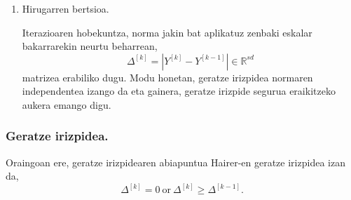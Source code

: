 \begin{enumerate}
\item Hirugarren bertsioa.

Iterazioaren hobekuntza, norma jakin bat aplikatuz zenbaki eskalar bakarrarekin neurtu beharrean,
\begin{equation}
\label{eq:DD3}
\Delta^{[k]}=|Y^{[k]}-Y^{[k-1]}| \in \mathbb{R}^{sd}
\end{equation}
matrizea erabiliko dugu. Modu honetan, geratze irizpidea normaren independentea izango da eta gainera, geratze irizpide segurua eraikitzeko aukera emango digu.

\end{enumerate} 


\subsubsection*{Geratze irizpidea.}

Oraingoan ere, geratze irizpidearen abiapuntua Hairer-en geratze irizpidea izan da,
\begin{equation*}
\Delta ^{[k]}=0 \ \text{or} \ \Delta^{[k]} \geqslant \Delta^{[k-1]}.
\end{equation*}

